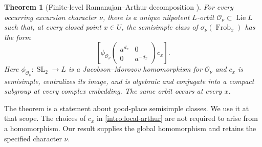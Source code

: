 \documentclass[11pt]{article}
\numberwithin{equation}{section}
\newtheorem{theorem}{Theorem}[section]
\theoremstyle{definition}
\theoremstyle{remark}
\newcommand{\Frob}{\operatorname{Frob}}
\newcommand{\Lie}{\operatorname{Lie}}
\newcommand{\SL}{\operatorname{SL}}
\begin{document}
\begin{theorem}[Finite-level Ramanujan--Arthur decomposition
  {\cite[Theorem~1.1]{Parent}}]\label{thm:parent}
For every occurring excursion character $\nu$, there is a unique
nilpotent $L$-orbit $\mathcal O_\nu\subset\Lie L$ such that, at every
closed point $x\in U$, the semisimple class of
$\sigma_\nu(\Frob_x)$ has the form
\begin{equation}\label{intro:local-arthur}
 \left[
  \phi_{\mathcal O_\nu}
      \begin{pmatrix}a^{d_x}&0\\0&a^{-d_x}\end{pmatrix}c_x
 \right].
\end{equation}
Here $\phi_{\mathcal O_\nu}:\SL_2\to L$ is a
Jacobson--Morozov homomorphism for $\mathcal O_\nu$ and $c_x$ is
semisimple, centralizes its image, and is algebraic and conjugate
into a compact subgroup at every complex embedding.  The same orbit
occurs at every $x$.
\end{theorem}

The theorem is a statement about good-place semisimple classes.
We use it at that scope.  The choices of $c_x$ in
\eqref{intro:local-arthur} are not required to arise from a
homomorphism.  Our result supplies the global homomorphism and
retains the specified character $\nu$.
\end{document}

